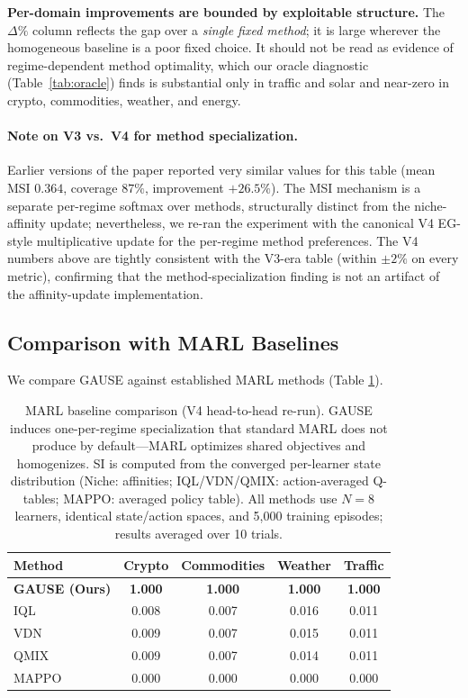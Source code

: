 \documentclass{article}
\begin{document}
\textbf{Per-domain improvements are bounded by exploitable structure.} The
$\Delta\%$ column reflects the gap over a \emph{single fixed method}; it is large
wherever the homogeneous baseline is a poor fixed choice. It should not be read
as evidence of regime-dependent method optimality, which our oracle diagnostic
(Table~\ref{tab:oracle}) finds is substantial only in traffic and solar and
near-zero in crypto, commodities, weather, and energy.

\paragraph{Note on V3 vs.\ V4 for method specialization.} Earlier versions of
the paper reported very similar values for this table (mean MSI $0.364$,
coverage $87\%$, improvement $+26.5\%$). The MSI mechanism is a separate
per-regime softmax over methods, structurally distinct from the niche-affinity
update; nevertheless, we re-ran the experiment with the canonical V4
EG-style multiplicative update for the per-regime method preferences. The
V4 numbers above are tightly consistent with the V3-era table (within $\pm
2\%$ on every metric), confirming that the method-specialization finding is
not an artifact of the affinity-update implementation.

\subsection{Comparison with MARL Baselines}

We compare GAUSE against established MARL methods (Table \ref{tab:marl}).

\begin{table}[t]
\centering
\small
\caption{MARL baseline comparison (V4 head-to-head re-run). GAUSE
induces one-per-regime specialization that standard MARL does not produce by
default---MARL optimizes shared objectives and homogenizes.
SI is computed from the converged per-learner state distribution (Niche:
affinities; IQL/VDN/QMIX: action-averaged Q-tables; MAPPO: averaged policy
table). All methods use $N = 8$ learners, identical state/action spaces,
and 5{,}000 training episodes; results averaged over 10 trials.}
\label{tab:marl}
\begin{tabular}{lcccc}
\toprule
\textbf{Method} & \textbf{Crypto} & \textbf{Commodities} & \textbf{Weather} & \textbf{Traffic} \\
\midrule
\textbf{GAUSE (Ours)} & \textbf{1.000} & \textbf{1.000} & \textbf{1.000} & \textbf{1.000} \\
IQL  & 0.008 & 0.007 & 0.016 & 0.011 \\
VDN  & 0.009 & 0.007 & 0.015 & 0.011 \\
QMIX & 0.009 & 0.007 & 0.014 & 0.011 \\
MAPPO & 0.000 & 0.000 & 0.000 & 0.000 \\
\bottomrule
\end{tabular}
\end{table}
\end{document}
